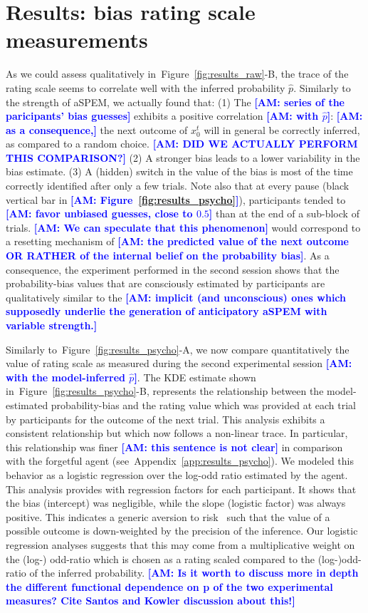 \documentclass[12pt,english]{article}%
\newcommand{\citep}[1]{\parencite{#1}}
\newcommand{\seeFig}[1]{Figure~\ref{fig:#1}}
\newcommand{\seeApp}[1]{Appendix~\ref{app:#1}}
\newcommand{\AM}[1]{\textbf{\textcolor{blue}{[AM: #1]}}}
\begin{document}
\section{Results: bias rating scale measurements}
\label{sec:rating_scale}
As we could assess qualitatively in~\seeFig{results_raw}-B,
the trace of the rating scale seems to correlate well
with the inferred probability $\hat{p}$.
Similarly to the strength of aSPEM, we actually found that:
(1) The \AM{series of the paricipants' bias guesses} exhibits a positive correlation \AM{with $\hat{p}$}:
\AM{as a consequence,} the next outcome of $x_{0}^{t}$ will in general be correctly inferred,
as compared to a random choice. \AM{DID WE ACTUALLY PERFORM THIS COMPARISON?}
(2) A stronger bias leads to a lower variability in the bias estimate.
(3) A (hidden) switch in the value of the bias is
most of the time correctly identified after only a few trials.
Note also that at every pause (black vertical bar in \AM{\seeFig{results_psycho}}),
participants tended to \AM{favor unbiased guesses, close to $0.5$}
than at the end of a sub-block of trials.
\AM{We can speculate that this phenomenon} would correspond to a resetting mechanism
of \AM{the predicted value of the next outcome OR RATHER of the internal belief on the probability bias}.
As a consequence, the experiment performed in the second session
shows that the probability-bias values that are consciously estimated by participants
are qualitatively similar to the \AM{implicit (and unconscious) ones which supposedly underlie the generation of anticipatory aSPEM with variable strength.}

Similarly to~\seeFig{results_psycho}-A,
we now compare quantitatively the value of rating scale
as measured during the second experimental session \AM{with the model-inferred $\hat{p}$}.
The KDE estimate shown in~\seeFig{results_psycho}-B,
represents the relationship between
the model-estimated probability-bias
and the rating value which was provided at each trial
by participants for the outcome of the next trial.
This analysis exhibits a consistent relationship
but which now follows a non-linear trace.
In particular, this relationship was finer \AM{this sentence is not clear}
in comparison with 
the forgetful agent (see~\seeApp{results_psycho}).
We modeled this behavior as
a logistic regression over
the log-odd ratio estimated by the agent.
This analysis provides with regression factors for each participant.
It shows that the bias (intercept)
was negligible, while the slope (logistic factor)
was always positive.
This indicates a generic aversion to risk~\citep{Kahneman13}
such that the value of a possible outcome
is down-weighted by the precision of the inference.
Our logistic regression analyses
suggests that this may come from a multiplicative weight
on the (log-) odd-ratio which is chosen as a rating scaled
compared to the (log-)odd-ratio of the inferred probability. \AM{Is it worth to discuss more in depth the different functional dependence on p of the two experimental measures? Cite Santos and Kowler discussion about this!}
\end{document}
